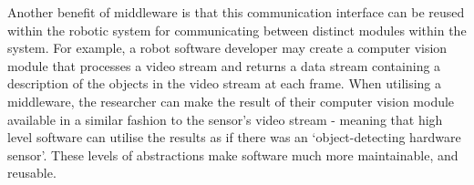 \documentclass[../dissertation.tex]{subfiles}
\begin{document}
Another benefit of middleware is that this communication interface can be reused within the robotic system for communicating between distinct modules within the system. For example, a robot software developer may create a computer vision module that processes a video stream and returns a data stream containing a description of the objects in the video stream at each frame. When utilising a middleware, the researcher can make the result of their computer vision module available in a similar fashion to the sensor's video stream - meaning that high level software can utilise the results as if there was an `object-detecting hardware sensor'. These levels of abstractions make software much more maintainable, and reusable.
\end{document}
